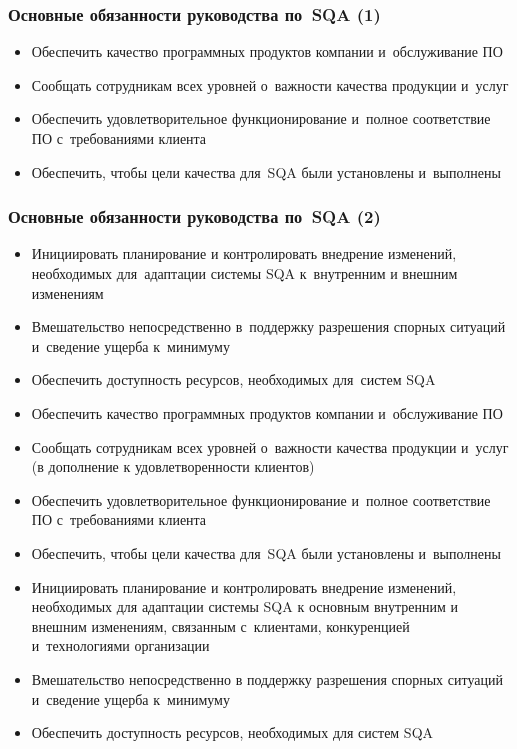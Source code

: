 \documentclass{../industrial-development}
\begin{document}
\begin{frame} \frametitle{Основные обязанности руководства по~SQA (1)}
 	 \begin{itemize}
\item Обеспечить качество программных продуктов компании и~обслуживание ПО
\item Сообщать сотрудникам всех уровней о~важности качества продукции и~услуг 
\item Обеспечить удовлетворительное функционирование и~полное соответствие ПО с~требованиями клиента
\item Обеспечить, чтобы цели качества для~SQA были установлены и~выполнены
  	\end{itemize}
\end{frame}

\begin{frame} \frametitle{Основные обязанности руководства по~SQA (2)}
 	 \begin{itemize}
\item Инициировать планирование и контролировать внедрение изменений, необходимых для~адаптации системы SQA к~внутренним и внешним изменениям
\item Вмешательство непосредственно в~поддержку разрешения спорных ситуаций и~сведение ущерба к~минимуму 
\item Обеспечить доступность ресурсов, необходимых для~систем SQA
  	\end{itemize}
\end{frame}

\lecturenotes

 	 \begin{itemize}
\item Обеспечить качество программных продуктов компании и~обслуживание ПО
\item Сообщать сотрудникам всех уровней о~важности качества продукции и~услуг (в дополнение к удовлетворенности клиентов) 
\item Обеспечить удовлетворительное функционирование и~полное соответствие ПО с~требованиями клиента
\item Обеспечить, чтобы цели качества для~SQA были установлены и~выполнены
\item Инициировать планирование и контролировать внедрение изменений, необходимых для адаптации системы SQA к основным внутренним и внешним изменениям, связанным с~клиентами, конкуренцией и~технологиями организации
\item Вмешательство непосредственно в поддержку разрешения спорных ситуаций и~сведение ущерба к~минимуму 
\item Обеспечить доступность ресурсов, необходимых для систем SQA~\cite[с.~544]{SQA-Galin}
  	\end{itemize}
\end{document}
